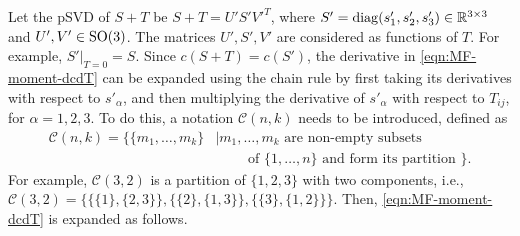 Let the pSVD of $S+T$ be $S+T=U'S'V'^T$, where $S' = \mathrm{diag}(s'_1,s'_2,s'_3) \in \mathbb{R}^{3\times 3}$ and $U',V'\in\mathrm{SO}(3)$.
The matrices $U',S',V'$ are considered as functions of $T$.
For example, $S'|_{T=0} = S$.
Since $c(S+T) = c(S') $, the derivative in \eqref{eqn:MF-moment-dcdT} can be expanded using the chain rule by first taking its derivatives with respect to $s'_\alpha$, and then multiplying the derivative of $s'_\alpha$ with respect to $T_{ij}$, for $\alpha = 1,2,3$.
To do this, a notation $\mathcal{C}(n,k)$ needs to be introduced, defined as
\begin{align} \label{eqn:MF-moment-C}
	\mathcal{C}(n,k) = \big\{ \{m_1,\ldots,m_k\} &| m_1,\ldots,m_k \text{ are non-empty subsets} \nonumber \\
	&\qquad \text{ of $\{1,\ldots, n\}$ and form its partition } \big\}.
\end{align}
For example, $\mathcal{C}(3,2)$ is a partition of $\{1,2,3\}$ with two components, i.e., $\mathcal{C}(3,2) = \Big\{ \big\{\{1\}, \allowbreak \{2,3\}\big\}, \allowbreak \big\{\{2\}, \allowbreak \{1,3\}\big\}, \allowbreak \big\{\{3\}, \allowbreak \{1,2\}\big\} \Big\}$.
Then, \eqref{eqn:MF-moment-dcdT} is expanded as follows.

